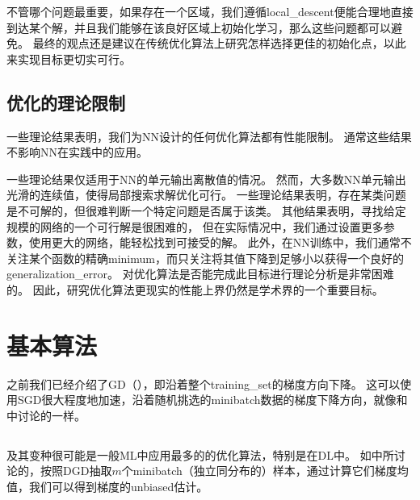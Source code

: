 
不管哪个问题最重要，如果存在一个区域，我们遵循\gls{local_descent}便能合理地直接到达某个解，并且我们能够在该良好区域上初始化学习，那么这些问题都可以避免。
最终的观点还是建议在传统优化算法上研究怎样选择更佳的初始化点，以此来实现目标更切实可行。


\subsection{优化的理论限制}
\label{sec:theoretical_limits_of_optimization}
一些理论结果表明，我们为\gls{NN}设计的任何优化算法都有性能限制\citep{Blum92,JuddBook,wolpert96no}。
通常这些结果不影响\gls{NN}在实践中的应用。


一些理论结果仅适用于\gls{NN}的单元输出离散值的情况。
然而，大多数\gls{NN}单元输出光滑的连续值，使得局部搜索求解优化可行。
一些理论结果表明，存在某类问题是不可解的，但很难判断一个特定问题是否属于该类。
其他结果表明，寻找给定规模的网络的一个可行解是很困难的，
但在实际情况中，我们通过设置更多参数，使用更大的网络，能轻松找到可接受的解。
此外，在\gls{NN}训练中，我们通常不关注某个函数的精确\gls{minimum}，而只关注将其值下降到足够小以获得一个良好的\gls{generalization_error}。
对优化算法是否能完成此目标进行理论分析是非常困难的。
因此，研究优化算法更现实的性能上界仍然是学术界的一个重要目标。



\section{基本算法}
\label{sec:basic_algorithms}
之前我们已经介绍了\gls{GD}（），即沿着整个\gls{training_set}的梯度方向下降。
这可以使用\gls{SGD}很大程度地加速，沿着随机挑选的\gls{minibatch}数据的梯度下降方向，就像和中讨论的一样。


\subsection{}
\label{sec:stochastic_gradient_descent_chap8}
及其变种很可能是一般\gls{ML}中应用最多的的优化算法，特别是在\gls{DL}中。
如中所讨论的，按照\gls{DGD}抽取$m$个\gls{minibatch}（独立同分布的）样本，通过计算它们梯度均值，我们可以得到梯度的\gls{unbiased}估计。

